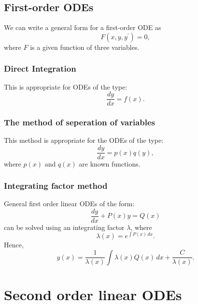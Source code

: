 \documentclass{article}
\begin{document}
\subsection{First-order ODEs}
We can write a general form for a first-order ODE as
\begin{equation}
    F(x,y,y^\prime) = 0,\nonumber
\end{equation}
where $F$ is a given function of three variables.
\subsubsection{Direct Integration}
This is appropriate for ODEs of the type:
\begin{equation}
    \frac{dy}{dx} = f(x).
\end{equation}

\subsubsection{The method of seperation of variables}
This method is appropriate for the ODEs of the type:
\begin{equation}
    \frac{dy}{dx} = p(x)q(y),
\end{equation}
where $p(x)$ and $q(x)$ are known functions.

\subsubsection{Integrating factor method}
General first order linear ODEs of the form:
\begin{equation}
    \frac{dy}{dx} + P(x)y = Q(x)
\end{equation}
can be solved using an integrating factor $\lambda$, where
\begin{equation}
    \lambda(x) = e^{\int P(x)\,dx}.
\end{equation}
Hence,
\begin{equation}
    y(x) = \frac{1}{\lambda(x)}\int \lambda(x)Q(x)\,dx+\frac{C}{\lambda(x)}.
\end{equation}

\section{Second order linear ODEs}
\end{document}
